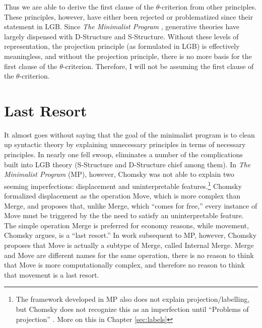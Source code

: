 \documentclass[MilwayThesis]{subfiles}
\begin{document}
Thus we are able to derive the first clause of the $\theta$-criterion from other principles.
These principles, however, have either been rejected or problematized since their statement in LGB.
Since \textit{The Minimalist Program} \parencite{chomsky1995minimalist}, generative theories have largely dispensed with D-Structure and S-Structure.
Without these levels of representation, the projection principle (as formulated in LGB) is effectively meaningless, and without the projection principle, there is no more basis for the first clause of the $\theta$-criterion.
Therefore, I will not be assuming the first clause of the $\theta$-criterion.

\section{Last Resort}
It almost goes without saying that the goal of the minimalist program is to clean up syntactic theory by explaining unnecessary principles in terms of necessary principles.
In nearly one fell swoop, \textcite{chomsky1995minimalist} eliminates a number of the complications built into LGB theory (S-Structure and D-Structure chief among them).
In \textit{The Minimalist Program} (MP), however, Chomsky was not able to explain two seeming imperfections: displacement and uninterpretable features.\footnote{
	The framework developed in MP also does not explain projection/labelling, but Chomsky does not recognize this as an imperfection until ``Problems of projection'' \parencite{chomsky2013problems}.
	More on this in Chapter \ref{sec:labels}
}
Chomsky formalized displacement as the operation Move, which is more complex than Merge, and proposes that, unlike Merge, which ``comes for free,'' every instance of Move must be triggered by the the need to satisfy an uninterpretable feature.
The simple operation Merge is preferred for economy reasons, while movement, Chomsky argues, is a ``last resort.''
In work subsequent to MP, however, Chomsky proposes that Move is actually a subtype of Merge, called Internal Merge.
Merge and Move are different names for the same operation, there is no reason to think that Move is more computationally complex, and therefore no reason to think that movement is a last resort.
\end{document}
